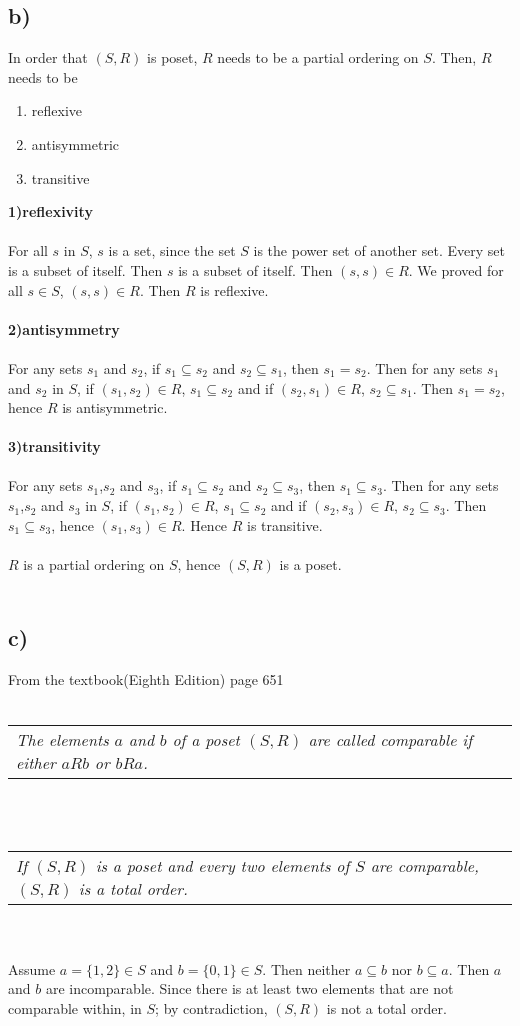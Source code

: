 \documentclass[11pt]{article}
\begin{document}
\subsection*{b)}
In order that $(S,R)$ is poset, $R$ needs to be a partial ordering on $S$. Then, $R$ needs to be
\begin{enumerate}
    \item reflexive
    \item antisymmetric
    \item transitive
\end{enumerate}
\textbf{1)reflexivity}
\\ \\
For all $s$ in $S$, $s$ is a set, since the set $S$ is the power set of another set.
Every set is a subset of itself. Then $s$ is a subset of itself. Then $(s,s) \in R$.
We proved for all $s \in S$, $(s,s) \in R$. Then $R$ is reflexive.
\\ \\
\textbf{2)antisymmetry}
\\ \\
For any sets $s_1$ and $s_2$, if $s_1 \subseteq s_2$ and $s_2 \subseteq s_1$, then $s_1 = s_2$.
Then for any sets $s_1$ and $s_2$ in $S$, if $(s_1,s_2) \in R$, $s_1 \subseteq s_2$ and if 
$(s_2,s_1) \in R$, $s_2 \subseteq s_1$. Then $s_1=s_2$, hence $R$ is antisymmetric.
\\ \\
\textbf{3)transitivity}
\\ \\
For any sets $s_1$,$s_2$ and $s_3$, if $s_1 \subseteq s_2$ and $s_2 \subseteq s_3$, then $s_1 
\subseteq s_3$. Then for any sets $s_1$,$s_2$ and $s_3$ in $S$, if $(s_1,s_2) \in R$, $s_1 \subseteq s_2$ 
and if $(s_2,s_3) \in R$, $s_2 \subseteq s_3$. Then $s_1 \subseteq s_3$, hence $(s_1,s_3) \in R$. 
Hence $R$ is transitive.
\\ \\
$R$ is a partial ordering on $S$, hence $(S,R)$ is a poset.
\\ \\
\subsection*{c)}
From the textbook(Eighth Edition) page 651
\\ \\
\begin{tabular}{l}
    \textit{The elements $a$ and $b$ of a poset $(S,R)$ are called comparable if either $aRb$ or $bRa$.}   
\end{tabular}
\\ \\
\begin{tabular}{l}
    \textit{If $(S,R)$ is a poset and every two elements of $S$ are comparable, $(S,R)$ is a total order.} 
\end{tabular}
\\ \\
Assume $a=\{1,2\} \in S$ and $b=\{0,1\} \in S$. Then neither $a \subseteq b$ nor $b \subseteq a$. Then 
$a$ and $b$ are incomparable. Since there is at least two elements that are not comparable within, in $S$;
by contradiction, $(S,R)$ is not a total order. 
\end{document}

